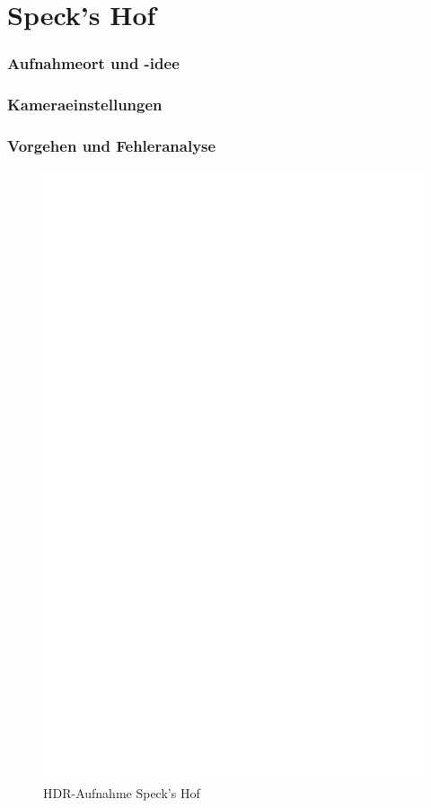 \documentclass[liststotoc,bibtotoc,fontsize=14pt,]{scrreprt}
\begin{document}
	\section{Speck's Hof}
	\label{sec:speck}
			\subsubsection{Aufnahmeort und -idee}
					
			\subsubsection{Kameraeinstellungen}
		
			
			\subsubsection{Vorgehen und Fehleranalyse}
		
					 \newpage
					 \begin{figure}[h]
					 	\includegraphics[width=\linewidth]{img/ph.jpg}
					 	\caption{HDR-Aufnahme Speck's Hof}
					 \end{figure}
			
\end{document}
